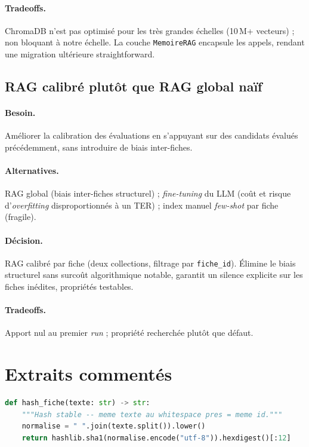 \paragraph{Tradeoffs.} ChromaDB n'est pas optimisé pour les très grandes échelles (10\,M+ vecteurs) ; non bloquant à notre échelle. La couche \texttt{MemoireRAG} encapsule les appels, rendant une migration ultérieure straightforward.

\subsection{RAG calibré plutôt que RAG global naïf}

\paragraph{Besoin.} Améliorer la calibration des évaluations en s'appuyant sur des candidats évalués précédemment, sans introduire de biais inter-fiches.

\paragraph{Alternatives.} RAG global (biais inter-fiches structurel) ; \textit{fine-tuning} du LLM (coût et risque d'\textit{overfitting} disproportionnés à un TER) ; index manuel \textit{few-shot} par fiche (fragile).

\paragraph{Décision.} RAG calibré par fiche (deux collections, filtrage par \texttt{fiche\_id}). Élimine le biais structurel sans surcoût algorithmique notable, garantit un silence explicite sur les fiches inédites, propriétés testables.

\paragraph{Tradeoffs.} Apport nul au premier \textit{run} ; propriété recherchée plutôt que défaut.

\section{Extraits commentés}

\begin{lstlisting}[language=Python,caption={Hash déterministe de la fiche de poste (\texttt{src/tools/rag.py})}]
def hash_fiche(texte: str) -> str:
    """Hash stable -- meme texte au whitespace pres = meme id."""
    normalise = " ".join(texte.split()).lower()
    return hashlib.sha1(normalise.encode("utf-8")).hexdigest()[:12]
\end{lstlisting}

